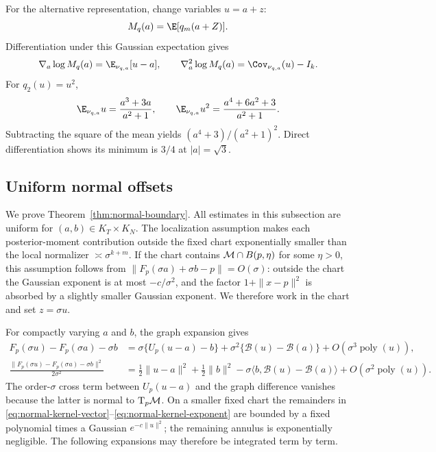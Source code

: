 For the alternative representation, change variables $u=a+z$:
\[
  M_q(a)=\E[q_m(a+Z)].
\]
Differentiation under this Gaussian expectation gives
\[
  \nabla_a\log M_q(a)=\E_{\nu_{q,a}}[u-a],
  \qquad
  \nabla_a^2\log M_q(a)=\Cov_{\nu_{q,a}}(u)-I_k.
\]
For $q_2(u)=u^2$,
\[
  \E_{\nu_{q,a}}u
  =\frac{a^3+3a}{a^2+1},
  \qquad
  \E_{\nu_{q,a}}u^2
  =\frac{a^4+6a^2+3}{a^2+1}.
\]
Subtracting the square of the mean yields
$(a^4+3)/(a^2+1)^2$.  Direct differentiation shows its minimum is $3/4$ at $|a|=\sqrt3$.

\subsection{Uniform normal offsets}
\label{app:normal-boundary}

We prove Theorem~\ref{thm:normal-boundary}.  All estimates in this
subsection are uniform for $(a,b)\in K_T\times K_N$.  The localization
assumption makes each posterior-moment contribution outside the fixed
chart exponentially smaller than the local normalizer
$\asymp\sigma^{k+m}$.  If the chart contains
$\mathcal{M}\cap B(p,\eta)$ for some $\eta>0$, this assumption follows
from $\|F_p(\sigma a)+\sigma b-p\|=O(\sigma)$: outside the chart the
Gaussian exponent is at most $-c/\sigma^2$, and the factor
$1+\|x-p\|^2$ is absorbed by a slightly smaller Gaussian exponent.
We therefore work in the chart and set $z=\sigma u$.

For compactly varying $a$ and $b$, the graph expansion gives
\begin{align}
  F_p(\sigma u)-F_p(\sigma a)-\sigma b
  &=
  \sigma\{U_p(u-a)-b\}
  +\sigma^2\{\mathcal B(u)-\mathcal B(a)\}
  +O(\sigma^3\operatorname{poly}(u)),\label{eq:normal-kernel-vector}\\
  \frac{\|F_p(\sigma u)-F_p(\sigma a)-\sigma b\|^2}{2\sigma^2}
  &=
  \frac12\|u-a\|^2+\frac12\|b\|^2
  -\sigma\langle b,\mathcal B(u)-\mathcal B(a)\rangle
  +O(\sigma^2\operatorname{poly}(u)).
  \label{eq:normal-kernel-exponent}
\end{align}
The order-$\sigma$ cross term between $U_p(u-a)$ and the graph
difference vanishes because the latter is normal to $\mathrm{T}_p\mathcal{M}$.  On a
smaller fixed chart the remainders in
\eqref{eq:normal-kernel-vector}--\eqref{eq:normal-kernel-exponent} are
bounded by a fixed polynomial times a Gaussian
$e^{-c\|u\|^2}$; the remaining annulus is exponentially negligible.
The following expansions may therefore be integrated term by term.

